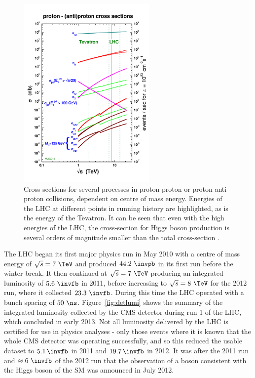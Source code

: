 \begin{figure}[htbp]
   \includegraphics[width=0.6\textwidth]{plots/detector/crosssections2012_v5.pdf}
\caption[Cross sections for several processes in proton-proton or proton-anti
proton collisions, dependent on centre of mass energy.]
{Cross sections for several processes in proton-proton or proton-anti
proton collisions, dependent on centre of mass energy. Energies of the LHC at
different points in running history are highlighted, as is the energy of the
Tevatron. It can be seen that even with the high energies of the LHC, the
cross-section for Higgs boson production is several orders of magnitude smaller than
the total cross-section \cite{stirling:xsecs}.}
\label{fig:LHCcrosssections}
\end{figure}

The LHC began its first major physics run in May 2010 with a centre of mass
energy of $\sqrt{s} = 7~\TeV$ and produced $44.2~\invpb$ in its first run
before the winter break. It then continued at $\sqrt{s} = 7~\TeV$
producing an integrated luminosity of $5.6~\invfb$ in 2011, before increasing to
$\sqrt{s} = 8~\TeV$ for the 2012 run, where it collected $23.3~\invfb$.
During this time the LHC operated with a bunch spacing of $50~\ns$. 
Figure~\ref{fig:detlumi} shows the summary of the
integrated luminosity collected by the CMS detector during run 1 of the LHC,
which concluded in early 2013. Not all luminosity delivered by the LHC is
certified for use in physics analyses - only those events where it is known that
the whole CMS detector was operating successfully, and so this reduced the
usable dataset to $5.1\,\invfb$ in 2011 and $19.7\,\invfb$ in 2012.
It was after the 2011 run and $\approx6~\invfb$ of the 2012 run that the
observation of a boson consistent with the Higgs boson of the \ac{SM} was
announced in July 2012. 


